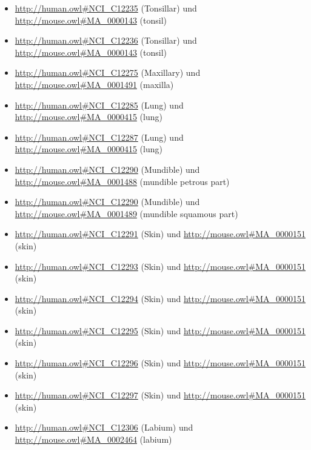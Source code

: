 \begin{itemize}
	\item \url{http://human.owl#NCI_C12235} (Tonsillar\textunderscoreFossa) und \url{http://mouse.owl#MA_0000143} (tonsil)
	\item \url{http://human.owl#NCI_C12236} (Tonsillar\textunderscorePillar) und \url{http://mouse.owl#MA_0000143} (tonsil)
	\item \url{http://human.owl#NCI_C12275} (Maxillary\textunderscoreSinus) und \url{http://mouse.owl#MA_0001491} (maxilla)
	\item \url{http://human.owl#NCI_C12285} (Lung\textunderscoreUpper\textunderscoreLobe) und \url{http://mouse.owl#MA_0000415} (lung)
	\item \url{http://human.owl#NCI_C12287} (Lung\textunderscoreLower\textunderscoreLobe) und \url{http://mouse.owl#MA_0000415} (lung)
	\item \url{http://human.owl#NCI_C12290} (Mundible) und \url{http://mouse.owl#MA_0001488} (mundible petrous part)
	\item \url{http://human.owl#NCI_C12290} (Mundible) und \url{http://mouse.owl#MA_0001489} (mundible squamous part)
	\item \url{http://human.owl#NCI_C12291} (Skin\textunderscoreof\textunderscorethe\textunderscoreLip) und \url{http://mouse.owl#MA_0000151} (skin)
	\item \url{http://human.owl#NCI_C12293} (Skin\textunderscoreof\textunderscoreOther\textunderscoreund\textunderscoreUnspecified\textunderscoreParts\textunderscoreof\textunderscoreFace) und \url{http://mouse.owl#MA_0000151} (skin)
	\item \url{http://human.owl#NCI_C12294} (Skin\textunderscoreof\textunderscorethe\textunderscoreScalp\textunderscoreund\textunderscoreNeck) und \url{http://mouse.owl#MA_0000151} (skin)
	\item \url{http://human.owl#NCI_C12295} (Skin\textunderscoreof\textunderscorethe\textunderscoreTrunk) und \url{http://mouse.owl#MA_0000151} (skin)
	\item \url{http://human.owl#NCI_C12296} (Skin\textunderscoreof\textunderscorethe\textunderscoreUpper\textunderscoreLimb\textunderscoreund\textunderscoreShoulder) und \url{http://mouse.owl#MA_0000151} (skin)
	\item \url{http://human.owl#NCI_C12297} (Skin\textunderscoreof\textunderscorethe\textunderscoreLower\textunderscoreLimb\textunderscoreund\textunderscoreHip) und \url{http://mouse.owl#MA_0000151} (skin)
	\item \url{http://human.owl#NCI_C12306} (Labium\textunderscoreMajus) und \url{http://mouse.owl#MA_0002464} (labium)

\end{itemize}
